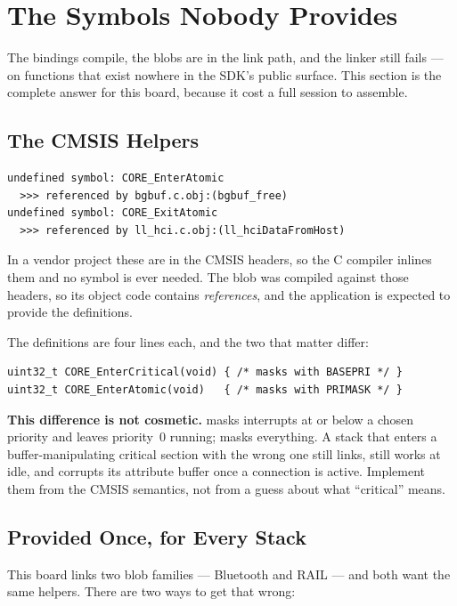 \section{The Symbols Nobody Provides}
\label{sec:ble-symbols}

The bindings compile, the blobs are in the link path, and the linker still fails — on functions that
exist nowhere in the SDK's public surface. This section is the complete answer for this board, because
it cost a full session to assemble.

\subsection{The CMSIS Helpers}

\begin{verbatim}
undefined symbol: CORE_EnterAtomic
  >>> referenced by bgbuf.c.obj:(bgbuf_free)
undefined symbol: CORE_ExitAtomic
  >>> referenced by ll_hci.c.obj:(ll_hciDataFromHost)
\end{verbatim}

In a vendor project these are  in the CMSIS headers, so the C compiler
inlines them and no symbol is ever needed. The blob was compiled against those headers, so its object
code contains \emph{references}, and the application is expected to provide the definitions.

The definitions are four lines each, and the two that matter differ:

\begin{verbatim}
uint32_t CORE_EnterCritical(void) { /* masks with BASEPRI */ }
uint32_t CORE_EnterAtomic(void)   { /* masks with PRIMASK */ }
\end{verbatim}

\textbf{This difference is not cosmetic.}  masks interrupts at or below a chosen
priority and leaves priority~0 running;  masks everything. A stack that enters a
buffer-manipulating critical section with the wrong one still links, still works at idle, and corrupts
its attribute buffer once a connection is active. Implement them from the CMSIS semantics, not from a
guess about what ``critical'' means.

\subsection{Provided Once, for Every Stack}

This board links two blob families — Bluetooth and RAIL — and both want the same helpers. There are
two ways to get that wrong:

